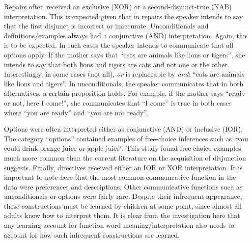 \documentclass[oneside]{report}
\theoremstyle{definition}
\theoremstyle{definition}
\theoremstyle{definition}
\theoremstyle{remark}
\begin{document}
Repairs often received an exclusive (XOR) or a second-disjunct-true
(NAB) interpretation. This is expected given that in repairs the speaker
intends to say that the first disjunct is incorrect or inaccurate.
Unconditionals and definitions/examples always had a conjunctive (AND)
interpretation. Again, this is to be expected. In such cases the speaker
intends to communicate that all options apply. If the mother says that
``cats are animals like lions or tigers'', she intends to say that both
lions and tigers are cats and not one or the other. Interestingly, in
some cases (not all), \emph{or} is replaceable by \emph{and}: ``cats are
animals like lions and tigers''. In unconditionals, the speaker
communicates that in both alternatives, a certain proposition holds. For
example, if the mother says ``ready or not, here I come!'', she
communicates that ``I come'' is true in both cases where ``you are
ready'' and ``you are not ready''.

Options were often interpreted either as conjunctive (AND) or inclusive
(IOR). The category ``options'' contained examples of free-choice
inferences such as ``you could drink orange juice or apple juice''. This
study found free-choice examples much more common than the current
literature on the acquisition of disjunction suggests. Finally,
directives received either an IOR or XOR interpretation. It is important
to note here that the most common communcative function in the data were
preferences and descriptions. Other communicative functions such as
unconditionals or options were fairly rare. Despite their infrequent
appearance, these constructions must be learned by children at some
point, since almost all adults know how to interpret them. It is clear
from the investigation here that any learning account for function word
meaning/interpretation also needs to account for how such infrequent
constructions are learned.
\end{document}
